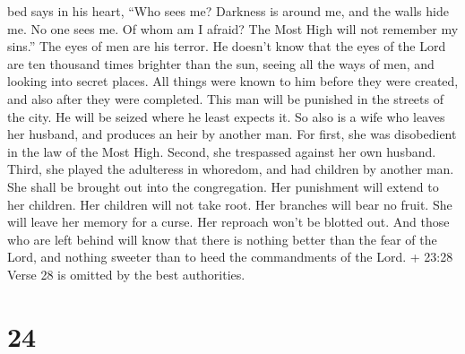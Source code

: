 bed says in his heart, ``Who sees me? Darkness is around me, and the
walls hide me. No one sees me. Of whom am I afraid? The Most High will
not remember my sins.''  The eyes of men are his terror. He
doesn't know that the eyes of the Lord are ten thousand times brighter
than the sun, seeing all the ways of men, and looking into secret
places.  All things were known to him before they were
created, and also after they were completed.  This man will
be punished in the streets of the city. He will be seized where he least
expects it.  So also is a wife who leaves her husband, and
produces an heir by another man.  For first, she was
disobedient in the law of the Most High. Second, she trespassed against
her own husband. Third, she played the adulteress in whoredom, and had
children by another man.  She shall be brought out into the
congregation. Her punishment will extend to her children. 
Her children will not take root. Her branches will bear no fruit.
 She will leave her memory for a curse. Her reproach won't
be blotted out.  And those who are left behind will know
that there is nothing better than the fear of the Lord, and nothing
sweeter than to heed the commandments of the Lord.  + 23:28
Verse 28 is omitted by the best authorities.

\hypertarget{section-20}{%
\section{24}\label{section-20}}

